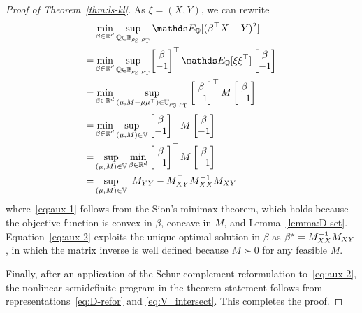 \documentclass{article}
\begin{document}
\begin{proof}[Proof of Theorem~\ref{thm:ls-kl}]
    As $\xi = (X, Y)$, we can rewrite
    \begin{subequations}
    \begin{align}
        & \Min{\beta \in \R^d} \Sup{\QQ \in \mbb B_{\rho_{\rm S}, \rho_{\rm T}}} \EE_\QQ[(\beta^\top X - Y)^2] \\
        =&\Min{\beta \in \R^d} 
        \Sup{\QQ \in \mbb B_{\rho_{\rm S}, \rho_{\rm T}}} \!\begin{bmatrix} \beta \\ -1 \end{bmatrix}^\top \EE_\QQ[\xi \xi^\top] \begin{bmatrix} \beta \\ -1 \end{bmatrix}
        \\
        = &\Min{\beta \in \R^d} \Sup{(\m, M- \m\m^\top) \in \mbb U_{\rho_{\rm S}, \rho_{\rm T}}} \begin{bmatrix} \beta \\ -1 \end{bmatrix}^\top M \begin{bmatrix} \beta \\ -1 \end{bmatrix} \notag\\
        = &\Min{\beta \in \R^d} \Sup{(\m, M) \in \mbb V} \begin{bmatrix} \beta \\ -1 \end{bmatrix}^\top M \begin{bmatrix} \beta \\ -1 \end{bmatrix} \notag\\
        = &\Sup{(\m, M) \in \mbb V}\Min{\beta \in \R^d}  \begin{bmatrix} \beta \\ -1 \end{bmatrix}^\top M \begin{bmatrix} \beta \\ -1 \end{bmatrix} \label{eq:aux-1}\\
        =& \Sup{(\m, M) \in \mbb V}~M_{YY} - M_{XY}^\top M_{XX}^{-1} M_{XY} \label{eq:aux-2}
\end{align}
\end{subequations}
where~\eqref{eq:aux-1} follows from the Sion's minimax theorem, which holds because the objective function is convex in $\beta$, concave in $M$, and Lemma~\ref{lemma:D-set}. Equation~\eqref{eq:aux-2} exploits the unique optimal solution in $\beta$ as $\beta^\star = M_{XX}^{-1} M_{XY}$, in which the matrix inverse is well defined because $M \succ 0$ for any feasible $M$.

Finally, after an application of the Schur complement reformulation to~\eqref{eq:aux-2}, the nonlinear semidefinite program in the theorem statement follows from representations~\eqref{eq:D-refor} and \eqref{eq:V_intersect}. This completes the proof.
\end{proof}
\end{document}
